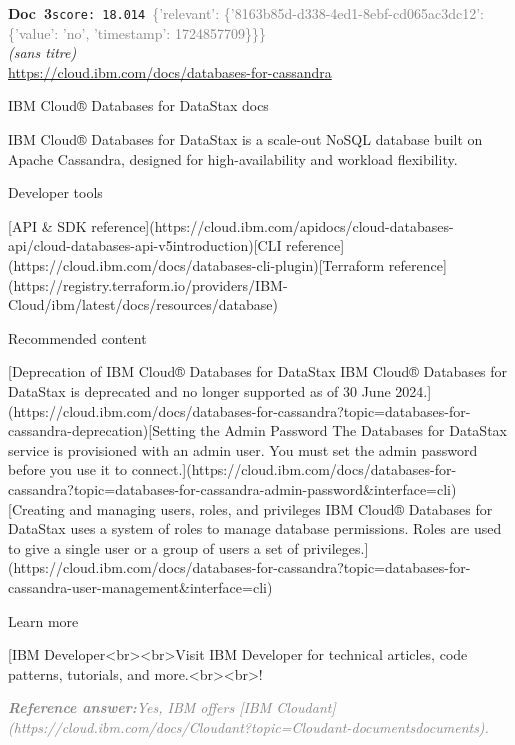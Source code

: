 \documentclass[a4paper,11pt]{article}
\begin{document}
\begin{docenv}
{\footnotesize\textcolor{doccolor}{\textbf{Doc~3}}}\hfill{\tiny\texttt{score:~18.014}}\ {\tiny\textcolor{gray}{\{'relevant': \{'8163b85d-d338-4ed1-8ebf-cd065ac3dc12': \{'value': 'no', 'timestamp': 1724857709\}\}\}}}\\[3pt]
{\small\textit{(sans titre)}}\\[2pt]
{\tiny\url{https://cloud.ibm.com/docs/databases-for-cassandra}}\\[4pt]
{\footnotesize 
IBM Cloud® Databases for DataStax docs 

IBM Cloud® Databases for DataStax is a scale-out NoSQL database built on Apache Cassandra, designed for high-availability and workload flexibility.

 Developer tools 

[API \& SDK reference](https://cloud.ibm.com/apidocs/cloud-databases-api/cloud-databases-api-v5introduction)[CLI reference](https://cloud.ibm.com/docs/databases-cli-plugin)[Terraform reference](https://registry.terraform.io/providers/IBM-Cloud/ibm/latest/docs/resources/database)

 Recommended content 

[Deprecation of IBM Cloud® Databases for DataStax IBM Cloud® Databases for DataStax is deprecated and no longer supported as of 30 June 2024.](https://cloud.ibm.com/docs/databases-for-cassandra?topic=databases-for-cassandra-deprecation)[Setting the Admin Password The Databases for DataStax service is provisioned with an admin user. You must set the admin password before you use it to connect.](https://cloud.ibm.com/docs/databases-for-cassandra?topic=databases-for-cassandra-admin-password\&interface=cli)[Creating and managing users, roles, and privileges IBM Cloud® Databases for DataStax uses a system of roles to manage database permissions. Roles are used to give a single user or a group of users a set of privileges.](https://cloud.ibm.com/docs/databases-for-cassandra?topic=databases-for-cassandra-user-management\&interface=cli)

 Learn more 

[IBM Developer<br><br>Visit IBM Developer for technical articles, code patterns, tutorials, and more.<br><br>!}
\end{docenv}
\begin{refanswerenv}
{\footnotesize\textit{\textcolor{gray}{\textbf{Reference answer:}\enspace Yes, IBM offers [IBM Cloudant](https://cloud.ibm.com/docs/Cloudant?topic=Cloudant-documentsdocuments).}}}
\end{refanswerenv}
\end{document}
